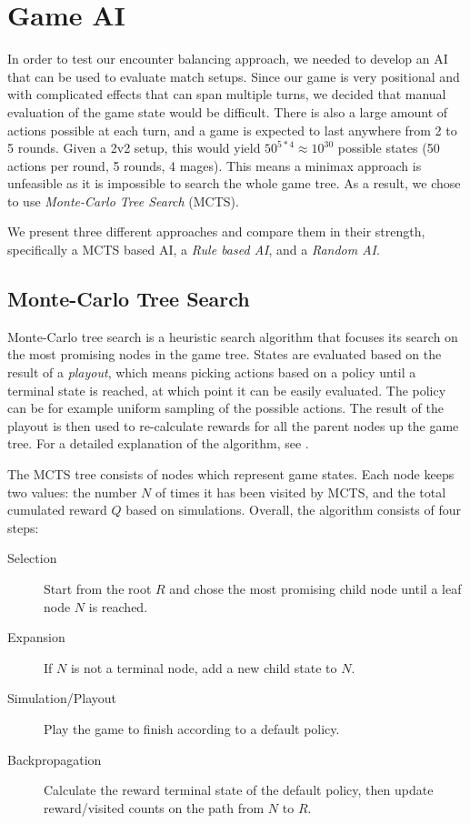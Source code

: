 \chapter{Game AI}
\label{chapter03}

In order to test our encounter balancing approach, we needed to develop an
AI that can be used to evaluate match setups. Since our game is very
positional and with complicated effects that can span multiple turns, we
decided that manual evaluation of the game state would be difficult. There
is also a large amount of actions possible at each turn, and a game is expected
to last anywhere from 2 to 5 rounds. Given a 2v2 setup, this would yield
$50^{5*4} \approx 10^{30}$ possible states (50 actions per round, 5 rounds, 4 mages).
This means a minimax approach is unfeasible as it is impossible to search the whole
game tree. As a result, we chose to use \emph{Monte-Carlo Tree Search} (MCTS).


We present three different approaches and compare them in their strength,
specifically a MCTS based AI, a \emph{Rule based AI}, and a \emph{Random AI}.

\section{Monte-Carlo Tree Search}

Monte-Carlo tree search is a heuristic search algorithm that focuses its search on the most
promising nodes in the game tree. States are evaluated based on the result of a \emph{playout}, which
means picking actions based on a policy until a terminal state is reached, at which point it can be easily
evaluated. The policy can be for example uniform sampling of the possible actions. The result
of the playout is then used to re-calculate rewards for all the parent nodes up the game tree. For a detailed explanation
of the algorithm, see \citet{mcts-survey}.

The MCTS tree consists of nodes which represent game states. Each node keeps two values: the number $N$ of times
it has been visited by MCTS, and the total cumulated reward $Q$ based on simulations. Overall, the algorithm consists of four steps:

\begin{description}
	\item[Selection] Start from the root $R$ and chose the most promising child node until a leaf node $N$ is reached.
	\item[Expansion] If $N$ is not a terminal node, add a new child state to $N$.
	\item[Simulation/Playout] Play the game to finish according to a default policy.
	\item[Backpropagation] Calculate the reward terminal state of the default policy, then update reward/visited counts on the path from $N$ to $R$.
\end{description}

